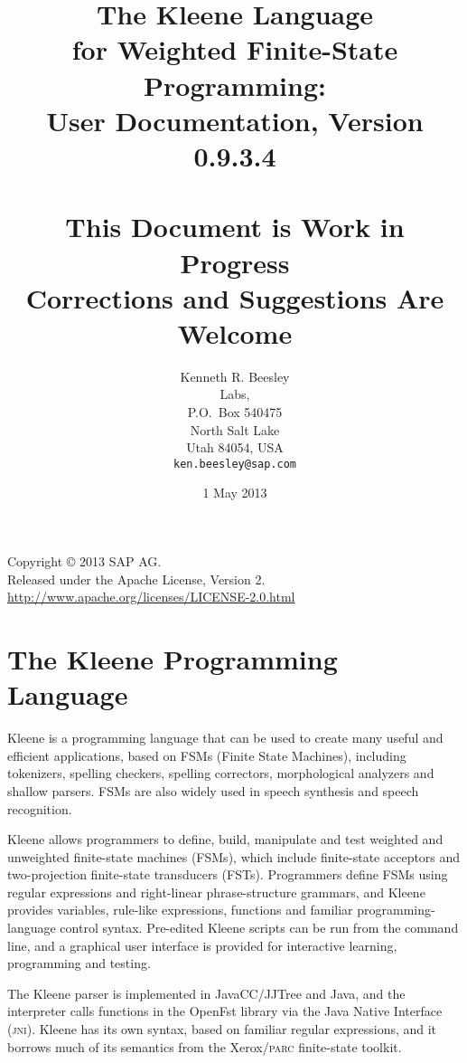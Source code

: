 \documentclass[letterpaper,12pt]{book}
\title{The Kleene Language\\
for Weighted Finite-State Programming:\\
{\Large User Documentation, Version 0.9.3.4}\\
\mbox{}\\
{\Large This Document is Work in Progress\\
Corrections and Suggestions Are Welcome}}
\author{Kenneth R. Beesley\\
\init{sap} Labs, \init{LLC}\\
P.O.~Box 540475\\
North Salt Lake\\
Utah 84054, USA\\
\texttt{ken.beesley@sap.com}}
\date{1 May 2013}
\providecommand{\acro}{}\renewcommand{\acro}{\textsc}
\providecommand{\init}{}\renewcommand{\init}{\MakeUppercase}
\newcommand{\Kleene}{Kleene}
\newcommand{\fsm}{\init{fsm}}
\newcommand{\fst}{\init{fst}}
\begin{document}
\VerbatimFootnotes

\maketitle

\null\vfill
\thispagestyle{empty}
\begin{center}
Copyright \copyright{} 2013 SAP AG.\\
Released under the Apache License, Version 2.\\
\url{http://www.apache.org/licenses/LICENSE-2.0.html}
\end{center}
\newpage

\frontmatter

\section*{The Kleene Programming Language}

Kleene is a programming language that can be used to create many useful and efficient applications, based
on \fsm{s} (Finite State Machines), including tokenizers, spelling checkers, spelling correctors,
morphological analyzers and shallow parsers.  \fsm{}s are also widely used in speech synthesis and speech
recognition.

\Kleene{} allows programmers to define, build,
manipulate and test weighted and unweighted finite-state machines (\fsm{}s), 
which include finite-state acceptors and two-projection 
finite-state transducers (\fst{}s).
Programmers define \fsm{}s using regular expressions and
right-linear phrase-structure grammars, and Kleene provides variables,
rule-like expressions, functions and familiar programming-language
control syntax.  Pre-edited \Kleene{}
scripts can be run from the command line, and a graphical user
interface is provided for interactive learning, programming and testing.

The \Kleene{} parser is implemented in
JavaCC/JJTree and
Java, and the
interpreter calls functions in the OpenFst library via the Java
Native Interface
(\acro{jni}).  Kleene has its own syntax, based on
familiar regular expressions, and it borrows much of its semantics from
the Xerox/\acro{parc} finite-state
toolkit.
\end{document}
